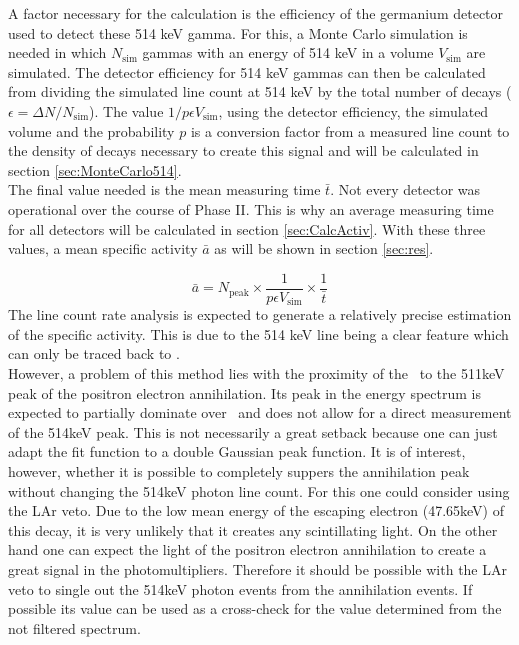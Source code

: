 \documentclass[encoding=utf8,british]{tumphthesis}
\begin{document}
A factor necessary for the calculation is the efficiency of the germanium detector used to detect these 514 keV gamma.
For this, a Monte Carlo simulation is needed in which $N_{\mathrm{sim}}$ gammas with an energy of 514 keV  in a  volume $V_{\mathrm{sim}}$ are simulated.
The detector efficiency for 514 keV gammas can then be calculated from dividing the simulated line count at 514 keV by the total number of  decays ($\epsilon = \Delta N/N_{\mathrm{sim}}$).
The value $1/p \epsilon V_{\mathrm{sim}}$, using the detector efficiency, the simulated volume and the probability $p$ is a conversion factor from a measured line count to the density of decays necessary to create this signal and will be calculated in section \ref{sec:MonteCarlo514}.
\\

The final value needed is the mean measuring time $\bar{t}$.
Not every detector was operational over the course of Phase II.
This is why an average measuring time for all detectors will be calculated in section \ref{sec:CalcActiv}.
With these three values, a mean specific activity $\bar{a}$ as will be shown in section \ref{sec:res}.

\begin{equation}
    \bar{a} = N_{\mathrm{peak}} \times \frac{1}{p \epsilon V_{\mathrm{sim}}} \times \frac{1}{\bar{t}}
    \label{equ:activityDieErste}
\end{equation}
The line count rate analysis is expected to generate a relatively precise estimation of the specific activity.
This is due to the 514 keV line being a clear feature which can only be traced back to \Kr.
\\


\iffalse
However, a problem of this method lies with the proximity of the \Kr\ to the 511keV peak of the positron electron annihilation. 
Its peak in the energy spectrum is expected to partially dominate over \Kr\ and does not allow for a direct measurement of the 514keV peak. 
This is not necessarily a great setback because one can just adapt the fit function to a double Gaussian peak function.
It is of interest, however, whether it is possible to completely suppers the annihilation peak without changing the 514keV photon line count.
For this one could consider using the LAr veto.
Due to the low mean energy of the escaping electron (47.65keV) of this decay, it is very unlikely that it creates any scintillating light. 
On the other hand one can expect the light of the positron electron annihilation to create a great signal in the photomultipliers.
Therefore it should be possible with the LAr veto to single out the 514keV photon events from the annihilation events.
If possible its value can be used as a cross-check for the value determined from the not filtered spectrum.
\end{document}
